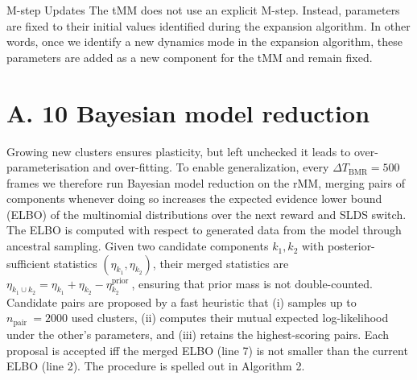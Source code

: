 \documentclass[10pt]{article}
\begin{document}
M-step Updates The tMM does not use an explicit M-step. Instead, parameters are fixed to their initial values identified during the expansion algorithm. In other words, once we identify a new dynamics mode in the expansion algorithm, these parameters are added as a new component for the tMM and remain fixed.

\section*{A. 10 Bayesian model reduction}
Growing new clusters ensures plasticity, but left unchecked it leads to over-parameterisation and over-fitting. To enable generalization, every $\Delta T_{\mathrm{BMR}}=500$ frames we therefore run Bayesian model reduction on the rMM, merging pairs of components whenever doing so increases the expected evidence lower bound (ELBO) of the multinomial distributions over the next reward and SLDS switch. The ELBO is computed with respect to generated data from the model through ancestral sampling. Given two candidate components $k_{1}, k_{2}$ with posterior-sufficient statistics $\left(\eta_{k_{1}}, \eta_{k_{2}}\right)$, their merged statistics are $\eta_{k_{1} \cup k_{2}}=\eta_{k_{1}}+\eta_{k_{2}}-\eta_{k_{2}}^{\text {prior }}$, ensuring that prior mass is not double-counted.\\
Candidate pairs are proposed by a fast heuristic that (i) samples up to $n_{\text {pair }}=2000$ used clusters, (ii) computes their mutual expected log-likelihood under the other's parameters, and (iii) retains the highest-scoring pairs. Each proposal is accepted iff the merged ELBO (line 7) is not smaller than the current ELBO (line 2). The procedure is spelled out in Algorithm 2.
\end{document}
